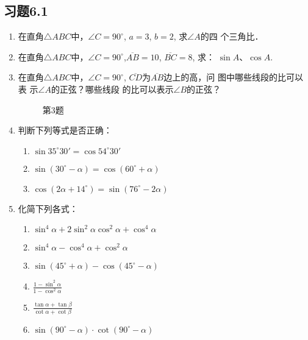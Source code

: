 \subsection*{习题6.1}
\begin{enumerate}
    \item 在直角$\triangle ABC$中，$\angle C=90^{\circ}$, $a=3$, $b=2$, 求$\angle A$的四
    个三角比．
    \item 在直角$\triangle ABC$中，$\angle C=90^{\circ}$,$\overline{AB}=10$, $\overline{BC}=8$, 求：
   $ \sin A$、$\cos A$.
    \item 在直角$\triangle ABC$中，$\angle C=90^{\circ}$, $\overline{CD}$为$\overline{AB}$边上的高，问
    图中哪些线段的比可以表
    示$\angle A$的正弦？哪些线段
    的比可以表示$\angle B$的正弦？
\begin{figure}[htp]
    \centering
    \caption*{第3题}
\end{figure}

    \item 判断下列等式是否正确：
\begin{enumerate}
\item $\sin35^{\circ} 30'=\cos54^{\circ} 30'$
\item $\sin(30^{\circ} -\alpha )=\cos(60^{\circ} +\alpha )$
\item $\cos(2\alpha +14^{\circ} )=\sin(76^{\circ} -2\alpha )$
\end{enumerate}

\item 化简下列各式：
\begin{enumerate}
\item $\sin^4\alpha  +2\sin^2\alpha \cos^2\alpha +\cos^4\alpha $
\item $\sin^4\alpha -\cos^4\alpha +\cos^2\alpha $
\item $\sin(45^{\circ} +\alpha )-\cos(45^{\circ} -\alpha )$    
\item $\frac{1-\sin^2\alpha }{1-\cos^2\alpha }$
\item $\frac{\tan \alpha +\tan \beta}{\cot\alpha +\cot \beta}$
\item $\sin(90^{\circ} -\alpha )\cdot \cot(90^{\circ} -\alpha )$
\end{enumerate}


\end{enumerate}
